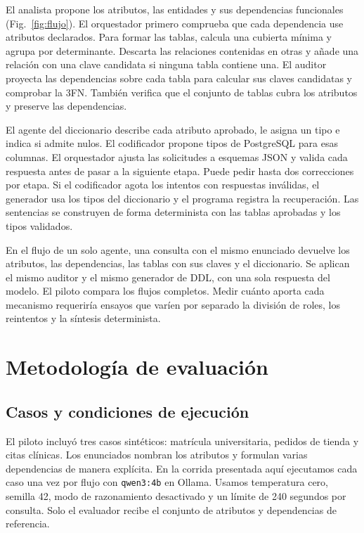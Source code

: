 \documentclass[conference]{IEEEtran}
\begin{document}
El analista propone los atributos, las entidades y sus dependencias funcionales (Fig.~\ref{fig:flujo}). El orquestador primero comprueba que cada dependencia use atributos declarados. Para formar las tablas, calcula una cubierta mínima y agrupa por determinante. Descarta las relaciones contenidas en otras y añade una relación con una clave candidata si ninguna tabla contiene una. El auditor proyecta las dependencias sobre cada tabla para calcular sus claves candidatas y comprobar la 3FN. También verifica que el conjunto de tablas cubra los atributos y preserve las dependencias.

El agente del diccionario describe cada atributo aprobado, le asigna un tipo e indica si admite nulos. El codificador propone tipos de PostgreSQL para esas columnas. El orquestador ajusta las solicitudes a esquemas JSON y valida cada respuesta antes de pasar a la siguiente etapa. Puede pedir hasta dos correcciones por etapa. Si el codificador agota los intentos con respuestas inválidas, el generador usa los tipos del diccionario y el programa registra la recuperación. Las sentencias se construyen de forma determinista con las tablas aprobadas y los tipos validados.

En el flujo de un solo agente, una consulta con el mismo enunciado devuelve los atributos, las dependencias, las tablas con sus claves y el diccionario. Se aplican el mismo auditor y el mismo generador de DDL, con una sola respuesta del modelo. El piloto compara los flujos completos. Medir cuánto aporta cada mecanismo requeriría ensayos que varíen por separado la división de roles, los reintentos y la síntesis determinista.

\section{Metodología de evaluación}

\subsection{Casos y condiciones de ejecución}

El piloto incluyó tres casos sintéticos: matrícula universitaria, pedidos de tienda y citas clínicas. Los enunciados nombran los atributos y formulan varias dependencias de manera explícita. En la corrida presentada aquí ejecutamos cada caso una vez por flujo con \texttt{qwen3:4b} en Ollama. Usamos temperatura cero, semilla 42, modo de razonamiento desactivado y un límite de 240 segundos por consulta. Solo el evaluador recibe el conjunto de atributos y dependencias de referencia.
\end{document}

